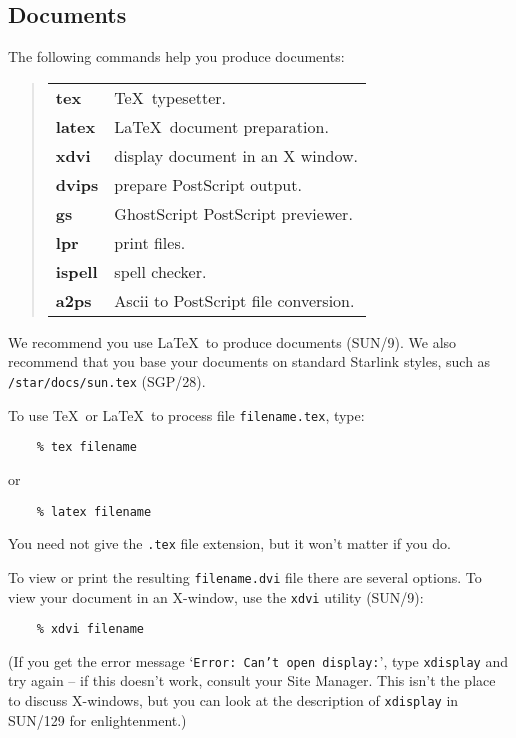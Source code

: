 \documentclass[twoside,11pt]{article}
\newcommand{\xref}[3]{#1}
\begin{document}
\subsection{Documents}
The following commands help you produce documents:
\begin{quote}
\begin{tabular}{lp{67mm}}

{\bf tex}   & \TeX\ typesetter.\\
{\bf latex} & \LaTeX\ document preparation.\\
{\bf xdvi}  & display document in an X window.\\
{\bf dvips} & prepare PostScript output.\\
{\bf gs}    & GhostScript PostScript previewer.\\
{\bf lpr}   & print files.\\
{\bf ispell} & spell checker.\\
{\bf a2ps} & Ascii to PostScript file conversion.

\end{tabular}
\end{quote}
We recommend you use \LaTeX\ to produce documents
(\xref{SUN/9}{sun9}{}).
We also recommend that you base your documents on standard Starlink styles,
such as {\tt /star/docs/sun.tex}
(\xref{SGP/28}{sgp28}{}).

To use \TeX\ or \LaTeX\ to process file {\tt filename.tex}, type:
\begin{verbatim}
    % tex filename
\end{verbatim}
or
\begin{verbatim}
    % latex filename
\end{verbatim}
You need not give the {\tt .tex} file extension, but it won't matter if you
do.

To view or print the resulting {\tt filename.dvi} file there are several
options.
To view your document in an X-window, use the {\tt xdvi} utility
(\xref{SUN/9}{sun9}{}):
\begin{verbatim}
    % xdvi filename
\end{verbatim}
(If you get the error message `{\tt Error: Can't open display:}', type
{\tt xdisplay} and try again -- if this doesn't work, consult your Site
Manager.
This isn't the place to discuss X-windows, but you can look at the description
of {\tt xdisplay} in
\xref{SUN/129}{sun129}{} for enlightenment.)
\end{document}
